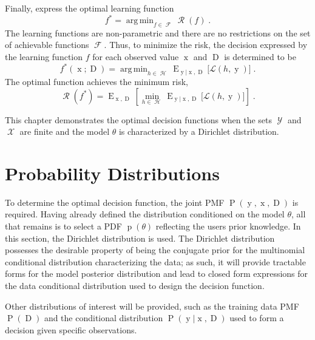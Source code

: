 \documentclass[12pt]{article}
\DeclareMathOperator*{\argmin}{arg\,min}
\DeclareMathOperator{\xrm}{\mathrm{x}}
\DeclareMathOperator{\yrm}{\mathrm{y}}
\DeclareMathOperator{\Drm}{\mathrm{D}}
\DeclareMathOperator{\Prm}{\mathrm{P}}
\DeclareMathOperator{\prm}{\mathrm{p}}
\DeclareMathOperator{\Erm}{\mathrm{E}}
\DeclareMathOperator{\Xcal}{\mathcal{X}}
\DeclareMathOperator{\Ycal}{\mathcal{Y}}
\DeclareMathOperator{\Hcal}{\mathcal{H}}
\DeclareMathOperator{\Fcal}{\mathcal{F}}
\DeclareMathOperator{\Rcal}{\mathcal{R}}
\begin{document}
Finally, express the optimal learning function
\begin{equation} 
f^* = \argmin_{f \in \Fcal} \Rcal(f) \;.
\end{equation}
The learning functions are non-parametric and there are no restrictions on the set of achievable functions $\Fcal$. Thus, to minimize the risk, the decision expressed by the learning function $f$ for each observed value $\xrm$ and $\Drm$ is determined to be
\begin{equation} \label{eq:f_opt_xD}
f^*(\xrm;\Drm) = \argmin_{h \in \Hcal} \Erm_{\yrm | \xrm,\Drm}\big[ \mathcal{L}(h,\yrm) \big] \;.
\end{equation}
The optimal function achieves the minimum risk,
\begin{equation} \label{eq_risk_min}
\Rcal(f^*) = \Erm_{\xrm,\Drm} \left[ \min_{h \in \Hcal} \Erm_{\yrm | \xrm,\Drm}\big[ \mathcal{L}(h,\yrm) \big] \right] \;.
\end{equation}















This chapter demonstrates the optimal decision functions when the sets $\Ycal$ and $\Xcal$ are finite and the model $\theta$ is characterized by a Dirichlet distribution.


\section{Probability Distributions}

To determine the optimal decision function, the joint PMF $\Prm(\yrm,\xrm,\Drm)$ is required. Having already defined the distribution conditioned on the model $\theta$, all that remains is to select a PDF $\prm(\theta)$ reflecting the users prior knowledge. In this section, the Dirichlet distribution is used. The Dirichlet distribution possesses the desirable property of being the conjugate prior for the multinomial conditional distribution characterizing the data; as such, it will provide tractable forms for the model posterior distribution and lead to closed form expressions for the data conditional distribution used to design the decision function.

Other distributions of interest will be provided, such as the training data PMF $\Prm(\Drm)$ and the conditional distribution $\Prm(\yrm | \xrm,\Drm)$ used to form a decision given specific observations.
\end{document}
